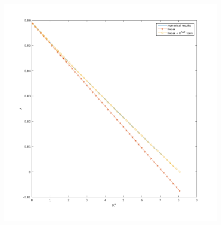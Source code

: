 \documentclass{article}
\begin{document}
\begin{figure}[!ht]\centering
\includegraphics[scale=0.5]{full-relation.png}
\end{figure}
\end{document}
